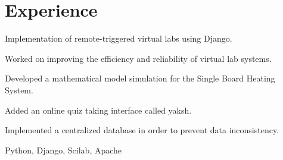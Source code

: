 
\section{Experience}

\vspace{\topsep} %
\begin{tightemize}
\item Implementation of remote-triggered virtual labs using Django.
\item Worked on improving the efficiency and reliability of virtual lab systems.
\item Developed a mathematical model simulation for the Single Board Heating System.
\item Added an online quiz taking interface called yaksh.
\item Implemented a centralized database in order to prevent data inconsistency.
\item {} Python, Django, Scilab, Apache
\end{tightemize}
\sectionsep